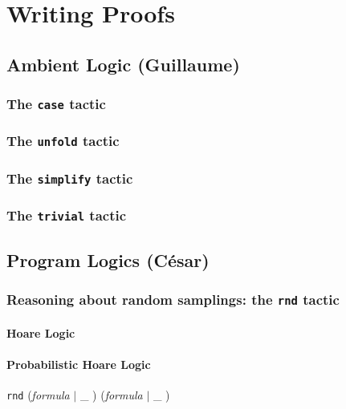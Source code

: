 \chapter{Writing Proofs}

\section{Ambient Logic (Guillaume)}


\subsection{The \texttt{case} tactic}
%

\subsection{The \texttt{unfold} tactic}
%

\subsection{The \texttt{simplify} tactic}
%

\subsection{The \texttt{trivial} tactic}
%

\section{Program Logics (C\'esar)}

\subsection{Reasoning about random samplings: the \texttt{rnd} tactic}
%
\subsubsection{Hoare Logic}

\subsubsection{Probabilistic Hoare Logic}
\Syntax 
\verb+rnd+ (\textit{formula} $|$ \_ ) (\textit{formula} $|$ \_ )

